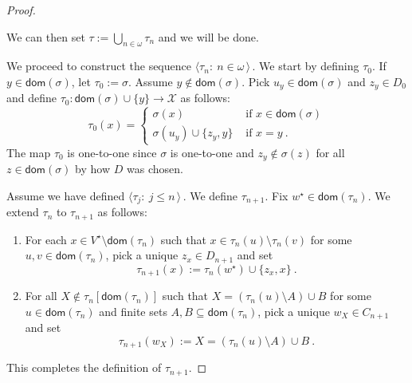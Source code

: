 \documentclass[10pt,a4paper, openany,  oldfontcommands]{memoir}
\newtheorem{open problem} [theorem] {Open Problem}
\begin{document}
\begin{proof}
\begin{enumerate}
\end{enumerate}
We can then set  $  \tau :=   \bigcup_{  n  \in   \omega  }   \tau_n $   and we will be done. 






We proceed to construct the sequence    $   \langle   \tau_n  :   \   n  \in  \omega   \,  \rangle        \,     $.
We start by defining  $  \tau_0  $. 
 If  $  y  \in      \mathsf{dom} \left(  \sigma   \right)  $, let   $  \tau_0 :=  \sigma  $. 
 Assume  $  y  \not\in     \mathsf{dom} \left(  \sigma   \right)   $. 
 Pick  $  u_y   \in     \mathsf{dom} \left(  \sigma   \right) $  and     $  z_y  \in D_0 $  and define  
 $  \tau_0  :    \mathsf{dom} \left(  \sigma   \right)   \cup    \lbrace y  \rbrace    \to    \mathcal{X}  $  as follows:  
 \[
 \tau_0  ( x)   =  \begin{cases}
 \sigma (x)     &    \mbox{  if  }  x  \in     \mathsf{dom} \left(  \sigma   \right)  
 \\
 \sigma ( u_y )  \cup   \lbrace  z_y  ,  y   \rbrace         &   \mbox{  if  }   x =  y  
 \       .
 \end{cases}
 \]
 The map $  \tau_0 $  is one-to-one  since  $  \sigma $  is one-to-one  
 and  $   z_y   \not \in  \sigma (z) $  for all   $   z  \in     \mathsf{dom} \left(  \sigma   \right)          $
 by how  $  D  $  was chosen.  
 
 
 
 
 Assume we have defined  $   \langle   \tau_j   :   \     j  \leq   n  \,  \rangle        \,     $.
 We define  $  \tau_{ n+1}   $. 
 Fix  $  w^{  \star }   \in   \mathsf{dom} \left(  \tau_n   \right)  $. 
 We extend  $  \tau_n  $  to  $  \tau_{ n+1}  $  as follows: 
 \begin{enumerate}
\item  For each  $  x   \in  V^{  \star }   \setminus     \mathsf{dom} \left(  \tau_n   \right)    $   such that  
$  x  \in  \tau_n (u)  \setminus  \tau_n (v)  $  for some  $  u, v  \in      \mathsf{dom} \left(  \tau_n   \right)    $, 
pick a unique  $  z_x  \in   D_{ n+1}    $  and set  
\[
\tau_{ n+1}  \left(   x  \right)   :=     \tau_n  \left(     w^{  \star }    \right)   \cup  \lbrace  z_x  ,  x   \rbrace   
\        .
\] 
 

\item   For  all  $  X  \not\in   \tau_n  \left[      \mathsf{dom} \left(  \tau_n   \right)   \right]  $  such that  
$  X  =   \left(   \tau_n  (u)   \setminus  A   \right)  \cup  B  $  for some  $  u  \in     \mathsf{dom} \left(  \tau_n   \right)   $  and 
finite sets  $  A, B   \subseteq     \mathsf{dom} \left(  \tau_n   \right)   $, 
pick a unique  $  w_X  \in   C_{ n+1}    $  and set  
\[
\tau_{ n+1}  \left(   w_X  \right)   :=   X   =     \left(   \tau_n  (u)   \setminus  A   \right)  \cup  B 
\       .
\] 
 \end{enumerate}
 This completes the definition of  $  \tau_{ n+1}  $. 
 \end{proof}
 
\end{document}
